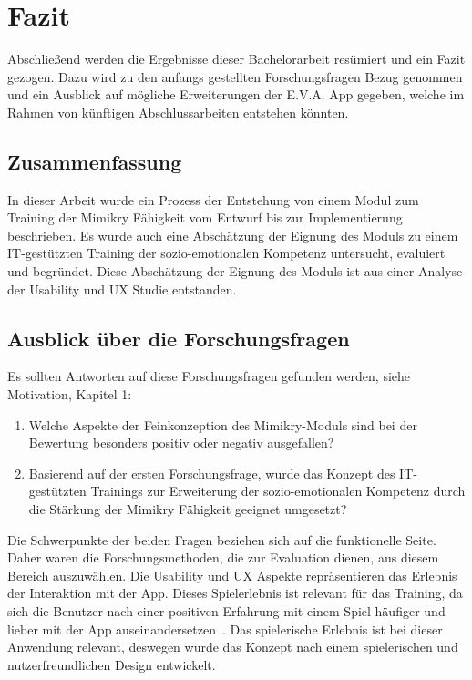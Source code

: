 \section{Fazit}
Abschließend werden die Ergebnisse dieser Bachelorarbeit resümiert und ein Fazit
gezogen. Dazu wird zu den anfangs gestellten Forschungsfragen Bezug genommen und ein Ausblick auf mögliche Erweiterungen der E.V.A. App gegeben, welche im Rahmen von künftigen Abschlussarbeiten entstehen könnten.
\subsection{Zusammenfassung}
In dieser Arbeit wurde ein Prozess der Entstehung von einem Modul zum Training der Mimikry Fähigkeit vom Entwurf bis zur Implementierung beschrieben. Es wurde auch eine Abschätzung der Eignung des Moduls zu einem IT-gestützten Training der sozio-emotionalen Kompetenz untersucht, evaluiert und begründet. Diese Abschätzung der Eignung des Moduls ist aus einer Analyse der Usability und UX Studie entstanden. 
\subsection{Ausblick über die Forschungsfragen}
Es sollten Antworten auf diese Forschungsfragen gefunden werden, siehe Motivation, Kapitel 1:
\begin{enumerate}
    \item Welche Aspekte der Feinkonzeption des Mimikry-Moduls sind bei der Bewertung besonders positiv oder negativ ausgefallen?
    \item Basierend auf der ersten Forschungsfrage, wurde das Konzept des IT-gestützten Trainings zur Erweiterung der sozio-emotionalen Kompetenz durch die Stärkung der Mimikry Fähigkeit geeignet umgesetzt?
\end{enumerate}
Die Schwerpunkte der beiden Fragen beziehen sich auf die funktionelle Seite. Daher waren die Forschungsmethoden, die zur Evaluation dienen, aus diesem Bereich auszuwählen. Die Usability und UX Aspekte repräsentieren das Erlebnis der Interaktion mit der App. Dieses Spielerlebnis ist relevant für das Training, da sich die Benutzer nach einer positiven Erfahrung mit einem Spiel häufiger und lieber mit der App auseinandersetzen~\cite{Usability}. Das spielerische Erlebnis ist bei dieser Anwendung relevant, deswegen wurde das Konzept nach einem spielerischen und nutzerfreundlichen Design entwickelt.

